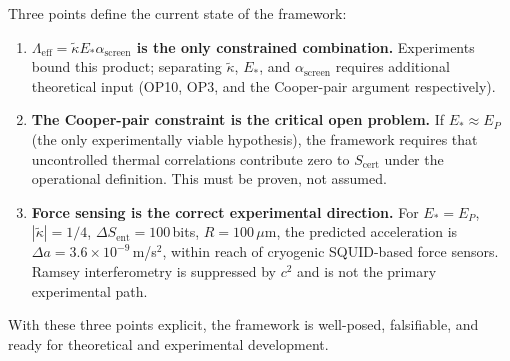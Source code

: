 \documentclass[11pt]{article}
\theoremstyle{plain}
\theoremstyle{definition}
\theoremstyle{remark}
\begin{document}
Three points define the current state of the framework:
\begin{enumerate}
\item \textbf{$\Lambda_{\mathrm{eff}} = \tilde{\kappa}E_*\alpha_{\mathrm{screen}}$ is the only constrained combination.}
  Experiments bound this product; separating $\tilde{\kappa}$, $E_*$, and $\alpha_{\mathrm{screen}}$
  requires additional theoretical input (OP10, OP3, and the Cooper-pair argument respectively).

\item \textbf{The Cooper-pair constraint is the critical open problem.}
  If $E_* \approx E_P$ (the only experimentally viable hypothesis), the framework requires
  that uncontrolled thermal correlations contribute zero to $S_{\mathrm{cert}}$ under the
  operational definition. This must be proven, not assumed.

\item \textbf{Force sensing is the correct experimental direction.}
  For $E_* = E_P$, $|\tilde{\kappa}| = 1/4$, $\Delta S_{\mathrm{ent}} = 100$\,bits, $R = 100\,\mu$m,
  the predicted acceleration is $\Delta a = 3.6\times10^{-9}$\,m/s$^2$, within reach of
  cryogenic SQUID-based force sensors. Ramsey interferometry is suppressed by $c^2$ and
  is not the primary experimental path.
\end{enumerate}

With these three points explicit, the framework is well-posed, falsifiable, and ready for
theoretical and experimental development.
\end{document}
